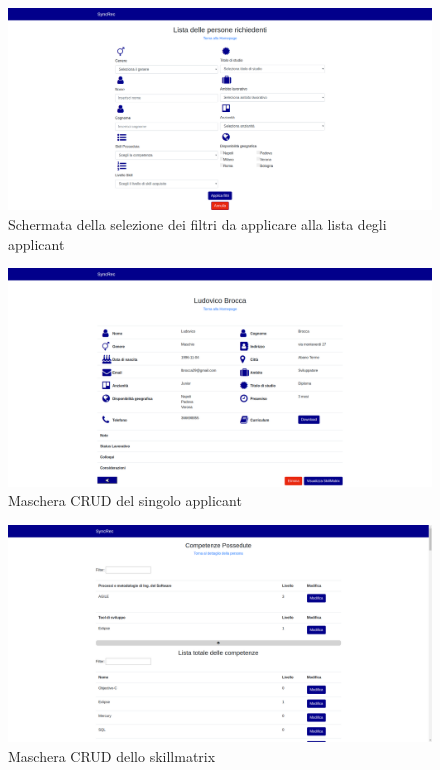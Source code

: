 \vspace{0.5em}
\begin{figure}[!h] 
	\centering 
	\includegraphics[width=1\columnwidth]{immagini/svil/filtri} 
	\caption{Schermata della selezione dei filtri da applicare alla lista degli applicant}
	\label{figura:filtri}
\end{figure}

\vspace{0.5em}
\begin{figure}[!h] 
	\centering 
	\includegraphics[width=1\columnwidth]{immagini/svil/applicant}
	\caption{Maschera CRUD del singolo applicant}
	\label{figura:applicant}
\end{figure}


\vspace{0.5em}
\begin{figure}[!h] 
	\centering 
	\includegraphics[width=1\columnwidth]{immagini/svil/skillmatrix} 
	\caption{Maschera CRUD dello skillmatrix}
	\label{figura:skillmatrix}
\end{figure}



